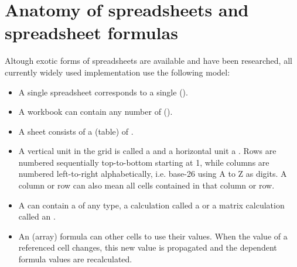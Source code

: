 \chapter{Anatomy of spreadsheets and spreadsheet formulas}
\label{chapter:anatomy}


Altough exotic forms of spreadsheets are available and have been researched, all currently widely used implementation use the following model:
\begin{itemize}
\item A single spreadsheet  corresponds to a single ().
\item A workbook can contain any number of ().
\item A sheet consists of a  (table) of .
\item A vertical unit in the grid is called a  and a horizontal unit a .
Rows are numbered sequentially top-to-bottom starting at 1, while columns are numbered left-to-right alphabetically, i.e. base-26 using A to Z as digits.
A column or row can also mean all cells contained in that column or row.
\item A  can contain a  of any type, a calculation called a  or a matrix calculation called an .
\item An (array) formula can  other cells to use their values. When the value of a referenced cell changes, this new value is propagated and the dependent formula values are recalculated.
\end{itemize}

